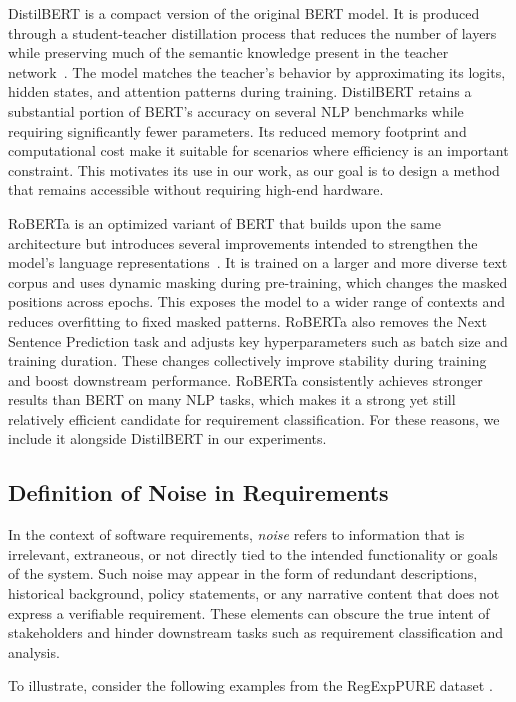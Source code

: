 \documentclass[sigconf,review]{acmart}
\begin{document}
DistilBERT is a compact version of the original BERT model. It is produced through a student-teacher distillation process that reduces the number of layers while preserving much of the semantic knowledge present in the teacher network~\cite{sanh2019distilbert}. The model matches the teacher's behavior by approximating its logits, hidden states, and attention patterns during training. DistilBERT retains a substantial portion of BERT's accuracy on several NLP benchmarks while requiring significantly fewer parameters. Its reduced memory footprint and computational cost make it suitable for scenarios where efficiency is an important constraint. This motivates its use in our work, as our goal is to design a method that remains accessible without requiring high-end hardware.

RoBERTa is an optimized variant of BERT that builds upon the same architecture but introduces several improvements intended to strengthen the model's language representations~\cite{liu2019roberta}. It is trained on a larger and more diverse text corpus and uses dynamic masking during pre-training, which changes the masked positions across epochs. This exposes the model to a wider range of contexts and reduces overfitting to fixed masked patterns. RoBERTa also removes the Next Sentence Prediction task and adjusts key hyperparameters such as batch size and training duration. These changes collectively improve stability during training and boost downstream performance. RoBERTa consistently achieves stronger results than BERT on many NLP tasks, which makes it a strong yet still relatively efficient candidate for requirement classification. For these reasons, we include it alongside DistilBERT in our experiments.


\subsection{Definition of Noise in Requirements}

In the context of software requirements, \textit{noise} refers to information that is irrelevant, extraneous, or not directly tied to the intended functionality or goals of the system. Such noise may appear in the form of redundant descriptions, historical background, policy statements, or any narrative content that does not express a verifiable requirement. These elements can obscure the true intent of stakeholders and hinder downstream tasks such as requirement classification and analysis.

To illustrate, consider the following examples from the RegExpPURE dataset \cite{ivanov2021regexppure}.
\end{document}
